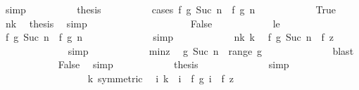 \begin{isabellebody}
\ simp\isanewline
\ \ \ \ \ \ \ \ \isamarkupfalse%
\ {\isacharquery}thesis\isanewline
\ \ \ \ \ \ \ \ \isamarkupfalse%
\ {\isacharparenleft}cases\ {\isachardoublequoteopen}f\ {\isacharparenleft}g\ {\isacharparenleft}Suc\ n{\isacharparenright}{\isacharparenright}\ {\isacharequal}\ f\ {\isacharparenleft}g\ n{\isacharparenright}{\isachardoublequoteclose}{\isacharparenright}\isanewline
\ \ \ \ \ \ \ \ \ \ \isamarkupfalse%
\ True\ \isamarkupfalse%
\ n{\isacharunderscore}k\ \isamarkupfalse%
\ {\isacharquery}thesis\ \isamarkupfalse%
\ simp\isanewline
\ \ \ \ \ \ \ \ \isamarkupfalse%
\isanewline
\ \ \ \ \ \ \ \ \ \ \isamarkupfalse%
\ False\isanewline
\ \ \ \ \ \ \ \ \ \ \isamarkupfalse%
\ le\ \isamarkupfalse%
\ {\isachardoublequoteopen}f\ {\isacharparenleft}g\ {\isacharparenleft}Suc\ n{\isacharparenright}{\isacharparenright}\ {\isacharless}\ f\ {\isacharparenleft}g\ n{\isacharparenright}{\isachardoublequoteclose}\isanewline
\ \ \ \ \ \ \ \ \ \ \ \ \isamarkupfalse%
\ simp\isanewline
\ \ \ \ \ \ \ \ \ \ \isamarkupfalse%
\ n{\isacharunderscore}k\ k\ \isamarkupfalse%
\ {\isachardoublequoteopen}f\ {\isacharparenleft}g\ {\isacharparenleft}Suc\ n{\isacharparenright}{\isacharparenright}\ {\isacharless}\ f\ z{\isachardoublequoteclose}\isanewline
\ \ \ \ \ \ \ \ \ \ \ \ \isamarkupfalse%
\ simp\isanewline
\ \ \ \ \ \ \ \ \ \ \isamarkupfalse%
\ min{\isacharunderscore}z\ \isamarkupfalse%
\ {\isachardoublequoteopen}g\ {\isacharparenleft}Suc\ n{\isacharparenright}\ {\isasymnotin}\ range\ g{\isachardoublequoteclose}\isanewline
\ \ \ \ \ \ \ \ \ \ \ \ \isamarkupfalse%
\ blast\isanewline
\ \ \ \ \ \ \ \ \ \ \isamarkupfalse%
\ False\ \isamarkupfalse%
\ simp\isanewline
\ \ \ \ \ \ \ \ \ \ \isamarkupfalse%
\ {\isacharquery}thesis\isanewline
\ \ \ \ \ \ \ \ \ \ \ \ \isamarkupfalse%
\ simp\isanewline
\ \ \ \ \ \ \ \ \isamarkupfalse%
\isanewline
\ \ \ \ \ \ \isamarkupfalse%
\isanewline
\ \ \ \ \isamarkupfalse%
\isanewline
\ \ \isamarkupfalse%
\isanewline
\ \ \isamarkupfalse%
\ k\ {\isacharbrackleft}symmetric{\isacharbrackright}\ \isamarkupfalse%
\ {\isachardoublequoteopen}{\isasymforall}i{\isachardot}\ k\ {\isasymle}\ i\ {\isasymlongrightarrow}\ f\ {\isacharparenleft}g\ i{\isacharparenright}\ {\isacharequal}\ f\ z{\isachardoublequoteclose}\ \isanewline

\end{isabellebody}
